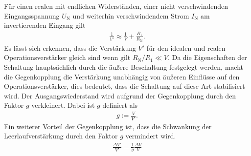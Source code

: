 Für einen realen mit endlichen Widerständen, einer nicht verschwindenden Eingangsspannung
$U_{\mathrm{N}}$ und weiterhin verschwindendem Strom $I_\text{N}$ am invertierenden Eingang gilt 
\begin{align}
	\frac{1}{V'}\approx\frac{1}{V}+\frac{R_1}{R_\text{N}}.
	\label{eq:leerlauf_verstaerkung}
\end{align}
Es lässt sich erkennen, dass die Verstärkung $V'$ für den idealen und realen Operationsverstärker gleich sind wenn gilt $R_\text{N}/R_1\ll V$.
Da die Eigenschaften der Schaltung hauptsächlich durch die äußere Beschaltung festgelegt werden,
macht die Gegenkopplung die Verstärkung unabhängig von äußeren Einflüsse auf den Operationsverstärker,
dies bedeutet, dass die Schaltung auf diese Art stabilisiert wird.
Der Ausgangswiederstand wird aufgrund der Gegenkopplung durch den Faktor $g$ verkleinert.
Dabei ist $g$ definiert als
\begin{align}
	g:= \frac{V}{V'}.
\end{align}
Ein weiterer Vorteil der Gegenkopplung ist, dass die Schwankung der Leerlaufverstärkung durch den Faktor $g$ vermindert wird.
\begin{align}
	\frac{\Delta V'}{V'}=\frac{1}{g}\frac{\Delta V}{V}
\end{align}

